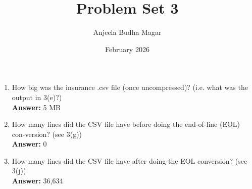 \documentclass{article}
\title{Problem Set 3}
\author{Anjeela Budha Magar}
\date{February 2026}
\begin{document}
\maketitle

\begin{enumerate}
    \item How big was the insurance .csv file (once uncompressed)? (i.e. what was the output in 3(e)?)\\
    \textbf{Answer:} 5 MB
    \item How many lines did the CSV file have before doing the end-of-line (EOL) con-version? (see 3(g))\\
    \textbf{Answer:} 0
    \item How many lines did the CSV file have after doing the EOL conversion? (see 3(j))\\
    \textbf{Answer:} 36,634
\end{enumerate}
\end{document}
